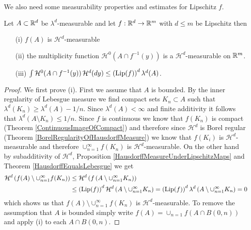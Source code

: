 We also need some measurability properties and estimates for Lipschitz $f$.
\begin{lem}\label{MeasurabilityOfMultiplicityFunction}Let $A \subset \mathbb{R}^d$ be $\lambda^d$-measurable and let $f : \mathbb{R}^d \to \mathbb{R}^m$ with $d \leq m$ be Lipschitz then
\begin{itemize}
\item[(i)] $f(A)$ is $\mathcal{H}^d$-measurable
\item[(ii)] the multiplicity function $\mathcal{H}^0( A \cap f^{-1} (y))$ is a $\mathcal{H}^d$-measurable on $\mathbb{R}^m$.
\item[(iii)] $\int \mathcal{H}^0( A \cap f^{-1} (y)) \, \mathcal{H}^d(dy) \leq \left( \operatorname*{Lip}(f) \right)^d \lambda^d(A)$.
\end{itemize}
\end{lem}
\begin{proof}
We first prove (i).  First we assume that $A$ is bounded.  By the inner regularity of Lebesgue measure we find compact sets $K_n \subset A$ such that $\lambda^d(K_n) \geq \lambda^d(A) - 1/n$.
Since $\lambda^d(A)<\infty$ and finite additivity it follows that $\lambda^d(A \setminus K_n) \leq 1/n$.  Since $f$ is continuous we know that $f(K_n)$ is compact (Theorem \ref{ContinuousImageOfCompact}) and therefore since $\mathcal{H}^d$ is Borel regular (Theorem \ref{BorelRegularityOfHausdorffMeasure}) we know that $f(K_i)$ is $\mathcal{H}^d$-measurable and therefore $\cup_{n=1}^\infty f(K_n)$ is $\mathcal{H}^d$-measurable.  On the other hand by subadditivity of $\mathcal{H}^d$, Proposition \ref{HausdorffMeasureUnderLipschitzMaps} and Theorem \ref{HausdorffEqualsLebesgue} we 
get
\begin{align*}
\mathcal{H}^d\left(f(A) \setminus \cup_{n=1}^\infty f(K_n) \right) &\leq \mathcal{H}^d\left(f\left(A \setminus \cup_{n=1}^\infty K_n\right ) \right) \\
&\leq \left( \operatorname*{Lip}(f) \right)^d \mathcal{H}^d \left(A \setminus \cup_{n=1}^\infty K_n\right ) = \left( \operatorname*{Lip}(f) \right)^d \lambda^d \left(A \setminus \cup_{n=1}^\infty K_n\right ) =0
\end{align*}
which shows us that $f(A) \setminus \cup_{n=1}^\infty f(K_n)$ is $\mathcal{H}^d$-measurable.  To remove the assumption that $A$ is bounded simply write $f(A) = \cup_{n=1} f(A \cap B(0,n))$ and apply (i) to each $A \cap B(0,n)$.


\end{proof}
